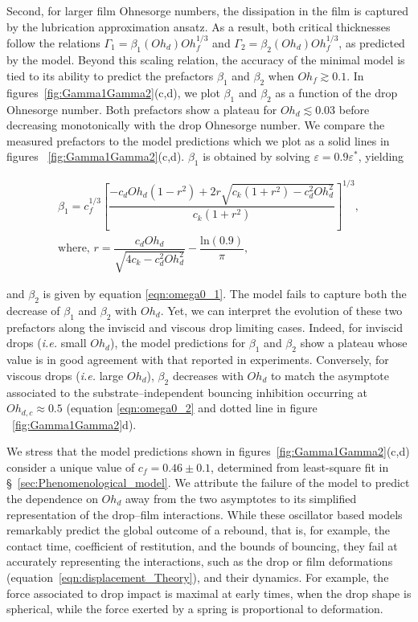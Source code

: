 \documentclass[]{jfm}
\newcommand{\Ohd}{\mathit{Oh}_\mathit{d}}
\newcommand{\Ohf}{\mathit{Oh}_\mathit{f}}
\begin{document}
Second, for larger film Ohnesorge numbers, the dissipation in the film is captured by the lubrication approximation ansatz. As a result, both critical thicknesses follow the relations $\Gamma_1 = \beta_1(\Ohd)\Ohf^{1/3}$ and $\Gamma_2 = \beta_2(\Ohd)\Ohf^{1/3}$, as predicted by the model. 
Beyond this scaling relation, the accuracy of the minimal model is tied to its ability to predict the prefactors $\beta_1$ and $\beta_2$ when $\Ohf \gtrsim 0.1$. In figures~\ref{fig:Gamma1Gamma2}(c,d), we plot $\beta_1$ and $\beta_2$ as a function of the drop Ohnesorge number. Both prefactors show a plateau for $\Ohd \lesssim 0.03$ before decreasing monotonically with the drop Ohnesorge number.
We compare the measured prefactors to the model predictions which we plot as a solid lines in figures ~\ref{fig:Gamma1Gamma2}(c,d). 
$\beta_1$ is obtained by solving $\varepsilon = 0.9\varepsilon^*$, yielding

\begin{align}
	\beta_{1} = c_{f}^{1/3} \left[ \dfrac{-c_{d} \Ohd (1 - r^{2}) + 2 r \sqrt{c_{k} (1 + r^{2}) - c_d^{2} \Ohd^{2}}}{c_{k} (1 + r^{2})} \right]^{1/3}, \label{alpha1}\\
	\text{where, } r = \dfrac{c_{d} \Ohd}{\sqrt{4 c_{k} - c_{d}^{2} \Ohd^{2}}} - \dfrac{\text{ln}(0.9)}{\pi},
\end{align}

\noindent and $\beta_2$ is given by equation \eqref{eqn:omega0_1}.
The model fails to capture both the decrease of $\beta_1$ and $\beta_2$ with $\Ohd$. Yet, we can interpret the evolution of these two prefactors along the inviscid and viscous drop limiting cases.
Indeed, for inviscid drops (\emph{i.e.} small $\Ohd$), the model predictions for $\beta_1$ and $\beta_2$ show a plateau whose value is in good agreement with that reported in experiments. 
Conversely, for viscous drops (\emph{i.e.} large $\Ohd$), $\beta_2$ decreases with $\Ohd$ to match the asymptote associated to the substrate--independent bouncing inhibition occurring at $Oh_{d,c} \approx 0.5$ (equation \eqref{eqn:omega0_2} and dotted line in figure ~\ref{fig:Gamma1Gamma2}d).

We stress that the model predictions shown in figures~\ref{fig:Gamma1Gamma2}(c,d) consider a unique value of $c_f = 0.46 \pm 0.1$, determined from least-square fit in \S~\ref{sec:Phenomenological_model}. 
We attribute the failure of the model to predict the dependence on $\Ohd$ away from the two asymptotes to its simplified representation of the drop--film interactions. 
While these oscillator based models remarkably predict the global outcome of a rebound, that is, for example, the contact time, coefficient of restitution, and the bounds of bouncing, they fail at accurately representing the interactions, such as the drop or film deformations (equation~\eqref{eqn:displacement_Theory}), and their dynamics. 
For example, the force associated to drop impact is maximal at early times, when the drop shape is spherical, while the force exerted by a spring is proportional to deformation. 
\end{document}
